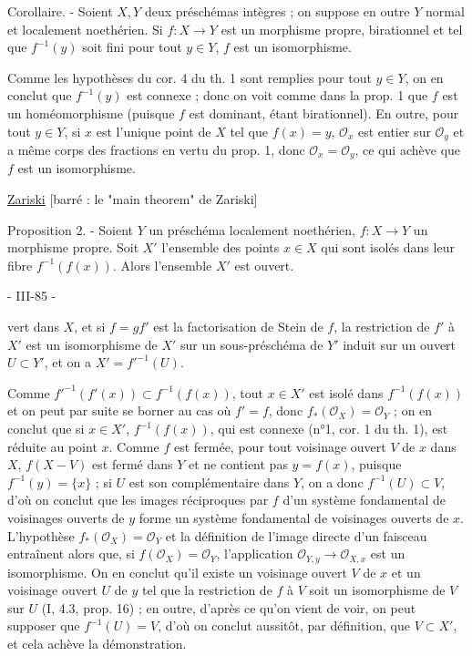 Corollaire. - Soient $X, Y$ deux préschémas intègres ; on suppose en outre $Y$ normal et localement noethérien. Si $f: X \to Y$ est un morphisme propre, birationnel et tel que $f^{-1}(y)$ soit fini pour tout $y \in Y$, $f$ est un isomorphisme.

Comme les hypothèses du cor. 4 du th. 1 sont remplies pour tout $y \in Y$, on en conclut que $f^{-1}(y)$ est connexe ; donc on voit comme dans la prop. 1 que $f$ est un homéomorphisme (puisque $f$ est dominant, étant birationnel). En outre, pour tout $y \in Y$, si $x$ est l'unique point de $X$ tel que $f(x)=y$, $\mathcal{O}_x$ est entier sur $\mathcal{O}_y$ et a même corps des fractions en vertu du prop. 1, donc $\mathcal{O}_x = \mathcal{O}_y$, ce qui achève que $f$ est un isomorphisme.

\underline{Zariski} [barré : le "main theorem" de Zariski]

Proposition 2. - Soient $Y$ un préschéma localement noethérien, $f: X \to Y$ un morphisme propre. Soit $X'$ l'ensemble des points $x \in X$ qui sont isolés dans leur fibre $f^{-1}(f(x))$. Alors l'ensemble $X'$ est ouvert.

\newpage


- III-85 -

vert dans $X$, et si $f=g f'$ est la factorisation de Stein de $f$, la restriction de $f'$ à $X'$ est un isomorphisme de $X'$ sur un sous-préschéma de $Y'$ induit sur un ouvert $U \subset Y'$, et on a $X' = f'^{-1}(U)$.

Comme $f'^{-1}(f'(x)) \subset f^{-1}(f(x))$, tout $x \in X'$ est isolé dans $f^{-1}(f(x))$ et on peut par suite se borner au cas où $f'=f$, donc $f_*(\mathcal{O}_X) = \mathcal{O}_Y$ ; on en conclut que si $x \in X'$, $f^{-1}(f(x))$, qui est connexe (n°1, cor. 1 du th. 1), est réduite au point $x$. Comme $f$ est fermée, pour tout voisinage ouvert $V$ de $x$ dans $X$, $f(X-V)$ est fermé dans $Y$ et ne contient pas $y=f(x)$, puisque $f^{-1}(y)=\{x\}$ ; si $U$ est son complémentaire dans $Y$, on a donc $f^{-1}(U) \subset V$, d'où on conclut que les images réciproques par $f$ d'un système fondamental de voisinages ouverts de $y$ forme un système fondamental de voisinages ouverts de $x$. L'hypothèse $f_*(\mathcal{O}_X) = \mathcal{O}_Y$ et la définition de l'image directe d'un faisceau entraînent alors que, si $f(\mathcal{O}_X) = \mathcal{O}_Y$, l'application $\mathcal{O}_{Y,y} \to \mathcal{O}_{X,x}$ est un isomorphisme. On en conclut qu'il existe un voisinage ouvert $V$ de $x$ et un voisinage ouvert $U$ de $y$ tel que la restriction de $f$ à $V$ soit un isomorphisme de $V$ sur $U$ (I, 4.3, prop. 16) ; en outre, d'après ce qu'on vient de voir, on peut supposer que $f^{-1}(U)=V$, d'où on conclut aussitôt, par définition, que $V \subset X'$, et cela achève la démonstration.

